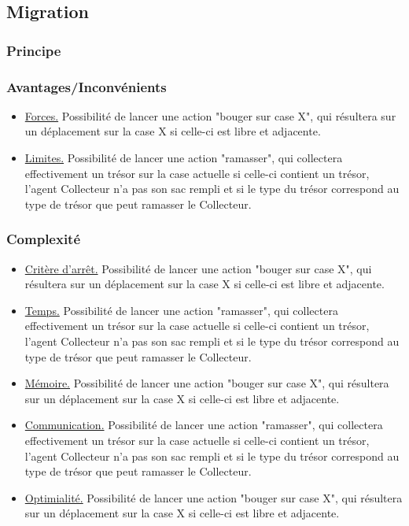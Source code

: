 \documentclass[a4paper, 10pt]{article}
\begin{document}
\subsection{Migration}

\subsubsection{Principe}

\blindtext

\subsubsection{Avantages/Inconvénients}

\begin{itemize}
            \item \underline{Forces.} Possibilité de lancer une action "bouger sur case X", qui résultera sur un déplacement sur la case {X} si celle-ci est libre et adjacente.
            \item \underline{Limites.} Possibilité de lancer une action "ramasser", qui collectera effectivement un trésor sur la case actuelle si celle-ci contient un trésor, l'agent Collecteur n'a pas son sac rempli et si le type du trésor correspond au type de trésor que peut ramasser le Collecteur.
\end{itemize}


\subsubsection{Complexité}

\begin{itemize}
            \item \underline{Critère d'arrêt.} Possibilité de lancer une action "bouger sur case X", qui résultera sur un déplacement sur la case {X} si celle-ci est libre et adjacente.
            \item \underline{Temps.} Possibilité de lancer une action "ramasser", qui collectera effectivement un trésor sur la case actuelle si celle-ci contient un trésor, l'agent Collecteur n'a pas son sac rempli et si le type du trésor correspond au type de trésor que peut ramasser le Collecteur.
            \item \underline{Mémoire.} Possibilité de lancer une action "bouger sur case X", qui résultera sur un déplacement sur la case {X} si celle-ci est libre et adjacente.
            \item \underline{Communication.} Possibilité de lancer une action "ramasser", qui collectera effectivement un trésor sur la case actuelle si celle-ci contient un trésor, l'agent Collecteur n'a pas son sac rempli et si le type du trésor correspond au type de trésor que peut ramasser le Collecteur.
            \item \underline{Optimialité.} Possibilité de lancer une action "bouger sur case X", qui résultera sur un déplacement sur la case {X} si celle-ci est libre et adjacente.
\end{itemize}
\end{document}
